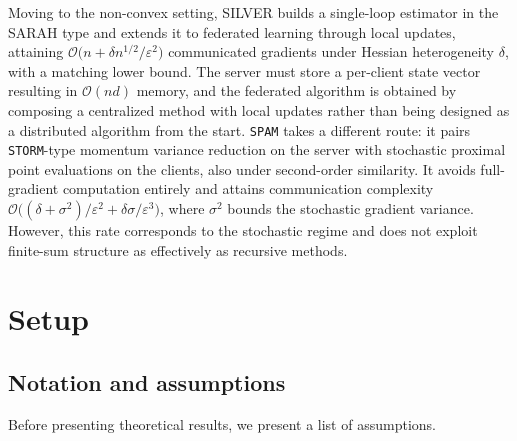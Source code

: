 \documentclass{article}
\DeclareMathOperator{\prox}{prox}
\begin{document}
Moving to the non-convex setting, SILVER \cite{oko2024silver} builds a 
single-loop estimator in the SARAH type and extends it to federated 
learning through local updates, attaining 
$\mathcal{O}\bigl(n + \delta n^{1/2} /\varepsilon^{2}\bigr)$ communicated 
gradients under Hessian heterogeneity $\delta$, with a matching lower bound.   
The server must store a per-client state vector resulting in 
$\mathcal{O}(nd)$ memory, and the federated algorithm is obtained 
by composing a centralized method with local updates rather than 
being designed as a distributed algorithm from the start. 
\texttt{SPAM} \cite{karagulyan2024spamstochasticproximalpoint} takes a 
different route: it pairs \texttt{STORM}-type momentum variance reduction on 
the server with stochastic proximal point evaluations on the clients, also 
under second-order similarity. It avoids full-gradient computation entirely 
and attains communication complexity 
$\mathcal{O}\bigl((\delta  + \sigma^{2})/\varepsilon^{2} + 
\delta \sigma / \varepsilon^{3}\bigr)$, where $\sigma^2$ bounds the stochastic gradient variance. However, this rate 
corresponds to the stochastic regime and does not exploit finite-sum structure 
as effectively as recursive methods.

\section{Setup} \label{setup}

\subsection{Notation and assumptions}

Before presenting theoretical results, we present a list of assumptions.


\end{document}
